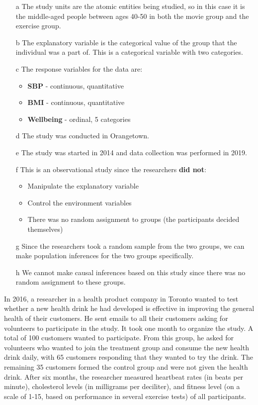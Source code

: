 \documentclass{article}
\theoremstyle{plain}
\theoremstyle{definition}
\theoremstyle{definition}
\begin{document}
\begin{tanswer}
    \begin{itemize}
        \item[a] The study units are the atomic entities being studied, so in this case it is the middle-aged people between ages 40-50 in both the movie group and the exercise group.
        \item[b] The explanatory variable is the categorical value of the group that the individual was a part of. This is a categorical variable with two categories.
        \item[c] The response variables for the data are:
        \begin{itemize}
            \item \textbf{SBP} - continuous, quantitative
            \item \textbf{BMI} - continuous, quantitative
            \item \textbf{Wellbeing} - ordinal, 5 categories
        \end{itemize}
        \item[d] The study was conducted in Orangetown.
        \item[e] The study was started in 2014 and data collection was performed in 2019.
        \item[f] This is an observational study since the researchers \textbf{did not}:
        \begin{itemize}
            \item Manipulate the explanatory variable
            \item Control the environment variables
            \item There was no random assignment to groups (the participants decided themselves)
        \end{itemize}
        \item[g] Since the researchers took a random sample from the two groups, we can make population inferences for the two groups specifically.
        \item[h] We cannot make causal inferences based on this study since there was no random assignment to these groups.
    \end{itemize}
\end{tanswer}
\begin{preamble}
    In 2016, a researcher in a health product company in Toronto wanted to test whether a new health drink
    he had developed is effective in improving the general health of their customers. He sent emails to all
    their customers asking for volunteers to participate in the study. It took one month to organize the study.
    A total of 100 customers wanted to participate. From this group, he asked for volunteers who wanted to
    join the treatment group and consume the new health drink daily, with 65 customers responding that they
    wanted to try the drink. The remaining 35 customers formed the control group and were not given the
    health drink. After six months, the researcher measured heartbeat rates (in beats per minute), cholesterol
    levels (in milligrams per deciliter), and fitness level (on a scale of 1-15, based on performance in several
    exercise tests) of all participants.
\end{preamble}
\end{document}

